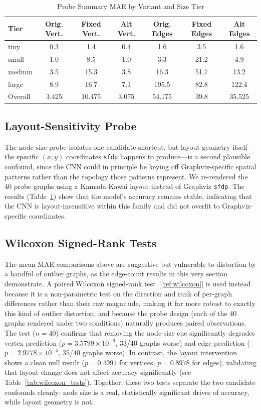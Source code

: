 \documentclass[11pt,letterpaper]{article}
\numberwithin{equation}{section}
\numberwithin{figure}{section}
\numberwithin{table}{section}
\begin{document}
\begin{table}[htbp]
\centering
\caption{Probe Summary MAE by Variant and Size Tier}
\label{tab:probe_summary}
\footnotesize
\begin{tabular}{lcccccc}
\toprule
Tier & Orig. Vert. & Fixed Vert. & Alt Vert. & Orig. Edges & Fixed Edges & Alt Edges \\
\midrule
tiny & 0.3 & 1.4 & 0.4 & 1.6 & 3.5 & 1.6 \\
small & 1.0 & 8.5 & 1.0 & 3.3 & 21.2 & 4.9 \\
medium & 3.5 & 15.3 & 3.8 & 16.3 & 51.7 & 13.2 \\
large & 8.9 & 16.7 & 7.1 & 195.5 & 82.8 & 122.4 \\
\midrule
Overall & 3.425 & 10.475 & 3.075 & 54.175 & 39.8 & 35.525 \\
\bottomrule
\end{tabular}
\end{table}

\subsection{Layout-Sensitivity Probe}
The node-size probe isolates one candidate shortcut, but layout geometry itself---the specific $(x,y)$ coordinates \texttt{sfdp} happens to produce---is a second plausible confound, since the CNN could in principle be keying off Graphviz-specific spatial patterns rather than the topology those patterns represent. We re-rendered the 40 probe graphs using a Kamada-Kawai layout instead of Graphviz \texttt{sfdp}. The results (Table~\ref{tab:probe_summary}) show that the model's accuracy remains stable, indicating that the CNN is layout-insensitive within this family and did not overfit to Graphviz-specific coordinates.

\subsection{Wilcoxon Signed-Rank Tests}
The mean-MAE comparisons above are suggestive but vulnerable to distortion by a handful of outlier graphs, as the edge-count results in this very section demonstrate. A paired Wilcoxon signed-rank test~[\ref{ref:wilcoxon}] is used instead because it is a non-parametric test on the direction and rank of per-graph differences rather than their raw magnitude, making it far more robust to exactly this kind of outlier distortion, and because the probe design (each of the 40 graphs rendered under two conditions) naturally produces paired observations. The test ($n=40$) confirms that removing the node-size cue significantly degrades vertex prediction ($p = 3.5799 \times 10^{-6}$, 33/40 graphs worse) and edge prediction ($p = 2.9778 \times 10^{-4}$, 35/40 graphs worse). In contrast, the layout intervention shows a clean null result ($p = 0.4991$ for vertices, $p = 0.8978$ for edges), validating that layout change does not affect accuracy significantly (see Table~\ref{tab:wilcoxon_tests}). Together, these two tests separate the two candidate confounds cleanly: node size is a real, statistically significant driver of accuracy, while layout geometry is not.
\end{document}
